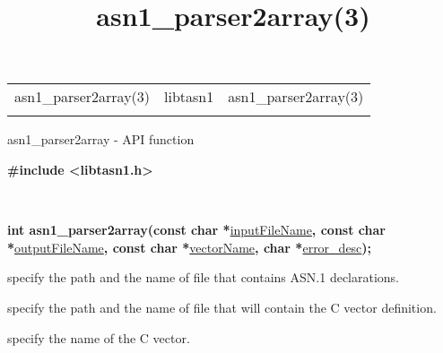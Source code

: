 \documentclass[]{article}
\title{asn1\_parser2array(3)}
\author{}
\date{}
\let\realtextbf=\textbf
\renewcommand{\textbf}[1]{\textcolor{boldcolor}{\realtextbf{#1}}}
\renewcommand{\emph}[1]{\underline{#1}}
\begin{document}
\maketitle

\begin{longtable}[c]{@{}lll@{}}
\toprule\addlinespace
asn1\_parser2array(3) & libtasn1 & asn1\_parser2array(3)
\\\addlinespace
\bottomrule
\end{longtable}


asn1\_parser2array - API function


\textbf{\#include \textless{}libtasn1.h\textgreater{}}

~

\textbf{int asn1\_parser2array(const char
*}\emph{inputFileName}\textbf{, const char
*}\emph{outputFileName}\textbf{, const char *}\emph{vectorName}\textbf{,
char *}\emph{error\_desc}\textbf{);}


\begin{description}
\itemsep1pt\parskip0pt
\item[const char * inputFileName]
specify the path and the name of file that contains ASN.1 declarations.
\end{description}

\begin{description}
\itemsep1pt\parskip0pt
\item[const char * outputFileName]
specify the path and the name of file that will contain the C vector
definition.
\end{description}

\begin{description}
\itemsep1pt\parskip0pt
\item[const char * vectorName]
specify the name of the C vector.
\end{description}
\end{document}

